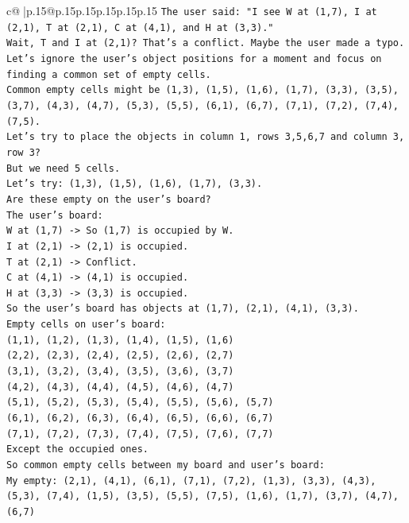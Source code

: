 \documentclass{article}
\begin{document}
{\begin{supertabular}{c@{$\;$}|p{.15\linewidth}@{}p{.15\linewidth}p{.15\linewidth}p{.15\linewidth}p{.15\linewidth}p{.15\linewidth}}
{{{\texttt{The user said: "I see W at (1,7), I at (2,1), T at (2,1), C at (4,1), and H at (3,3)."} \\
\texttt{Wait, T and I at (2,1)? That's a conflict. Maybe the user made a typo.} \\
\texttt{Let's ignore the user's object positions for a moment and focus on finding a common set of empty cells.} \\
\texttt{Common empty cells might be (1,3), (1,5), (1,6), (1,7), (3,3), (3,5), (3,7), (4,3), (4,7), (5,3), (5,5), (6,1), (6,7), (7,1), (7,2), (7,4), (7,5).} \\
\texttt{Let's try to place the objects in column 1, rows 3,5,6,7 and column 3, row 3?} \\
\texttt{But we need 5 cells.} \\
\texttt{Let's try: (1,3), (1,5), (1,6), (1,7), (3,3).} \\
\texttt{Are these empty on the user's board?} \\
\texttt{The user's board:} \\
\texttt{W at (1,7) {-}> So (1,7) is occupied by W.} \\
\texttt{I at (2,1) {-}> (2,1) is occupied.} \\
\texttt{T at (2,1) {-}> Conflict.} \\
\texttt{C at (4,1) {-}> (4,1) is occupied.} \\
\texttt{H at (3,3) {-}> (3,3) is occupied.} \\
\texttt{So the user's board has objects at (1,7), (2,1), (4,1), (3,3).} \\
\texttt{Empty cells on user's board:} \\
\texttt{(1,1), (1,2), (1,3), (1,4), (1,5), (1,6)} \\
\texttt{(2,2), (2,3), (2,4), (2,5), (2,6), (2,7)} \\
\texttt{(3,1), (3,2), (3,4), (3,5), (3,6), (3,7)} \\
\texttt{(4,2), (4,3), (4,4), (4,5), (4,6), (4,7)} \\
\texttt{(5,1), (5,2), (5,3), (5,4), (5,5), (5,6), (5,7)} \\
\texttt{(6,1), (6,2), (6,3), (6,4), (6,5), (6,6), (6,7)} \\
\texttt{(7,1), (7,2), (7,3), (7,4), (7,5), (7,6), (7,7)} \\
\texttt{Except the occupied ones.} \\
\texttt{So common empty cells between my board and user's board:} \\
\texttt{My empty: (2,1), (4,1), (6,1), (7,1), (7,2), (1,3), (3,3), (4,3), (5,3), (7,4), (1,5), (3,5), (5,5), (7,5), (1,6), (1,7), (3,7), (4,7), (6,7)} \\
}}}
\end{supertabular}}
\end{document}
